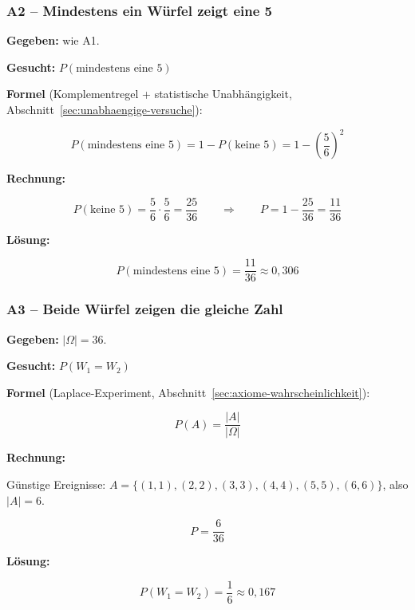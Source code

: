 \subsubsection*{A2 – Mindestens ein Würfel zeigt eine 5}

\begin{beispiel}

\textbf{Gegeben:} wie A1.

\textbf{Gesucht:} $P(\text{mindestens eine 5})$

\textbf{Formel} (Komplementregel + statistische Unabhängigkeit,
Abschnitt~\ref{sec:unabhaengige-versuche}):

$$
P(\text{mindestens eine 5}) = 1 - P(\text{keine 5})
= 1 - \left(\frac{5}{6}\right)^{2}
$$

\textbf{Rechnung:}

$$
P(\text{keine 5}) = \frac{5}{6}\cdot\frac{5}{6} = \frac{25}{36}
\qquad\Rightarrow\qquad
P = 1 - \frac{25}{36} = \frac{11}{36}
$$

\textbf{Lösung:}

$$
\boxed{P(\text{mindestens eine 5}) = \frac{11}{36} \approx 0{,}306}
$$

\end{beispiel}

\subsubsection*{A3 – Beide Würfel zeigen die gleiche Zahl}

\begin{beispiel}

\textbf{Gegeben:} $|\Omega| = 36$.

\textbf{Gesucht:} $P(W_1 = W_2)$

\textbf{Formel} (Laplace-Experiment, Abschnitt~\ref{sec:axiome-wahrscheinlichkeit}):

$$
P(A) = \frac{|A|}{|\Omega|}
$$

\textbf{Rechnung:}

Günstige Ereignisse: $A = \{(1,1),(2,2),(3,3),(4,4),(5,5),(6,6)\}$, also $|A| = 6$.

$$
P = \frac{6}{36}
$$

\textbf{Lösung:}

$$
\boxed{P(W_1 = W_2) = \frac{1}{6} \approx 0{,}167}
$$

\end{beispiel}

